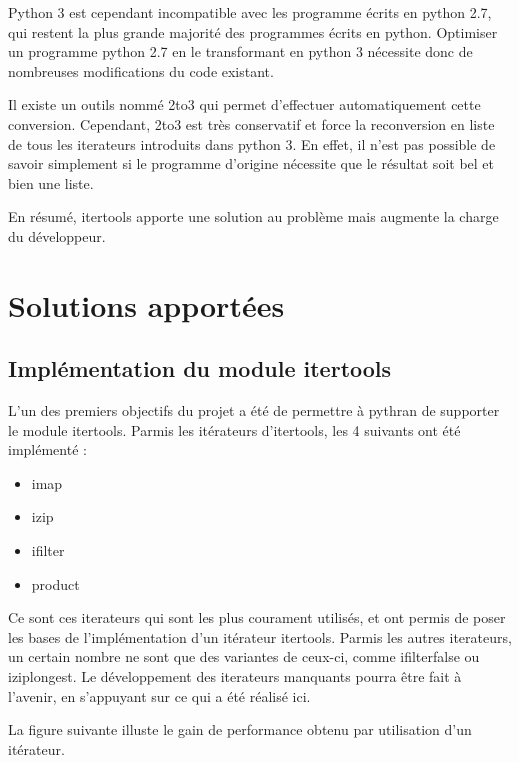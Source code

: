 \documentclass[a4paper]{article}
\begin{document}
Python 3 est cependant incompatible avec les programme écrits en
python 2.7, qui restent la plus grande majorité des programmes écrits
en python. Optimiser un programme python 2.7 en le transformant en
python 3 nécessite donc de nombreuses modifications du code existant.

Il existe un outils nommé 2to3 qui permet d'effectuer automatiquement
cette conversion. Cependant, 2to3 est très conservatif et force la
reconversion en liste de tous les iterateurs introduits dans python
3. En effet, il n'est pas possible de savoir simplement si le
programme d'origine nécessite que le résultat soit bel et bien une
liste.

En résumé, itertools apporte une solution au problème mais augmente la
charge du développeur.

\section*{Solutions apportées}

\subsection*{Implémentation du module itertools}

L'un des premiers objectifs du projet a été de permettre à pythran de
supporter le module itertools. Parmis les itérateurs d'itertools, les
4 suivants ont été implémenté :

\begin{itemize}
  \item imap
  \item izip
  \item ifilter
  \item product
\end{itemize}

Ce sont ces iterateurs qui sont les plus courament utilisés, et ont
permis de poser les bases de l'implémentation d'un itérateur
itertools. Parmis les autres iterateurs, un certain nombre ne sont que
des variantes de ceux-ci, comme ifilterfalse ou iziplongest. Le
développement des iterateurs manquants pourra être fait à l'avenir, en
s'appuyant sur ce qui a été réalisé ici.

La figure suivante illuste le gain de performance obtenu par
utilisation d'un itérateur.
\end{document}
